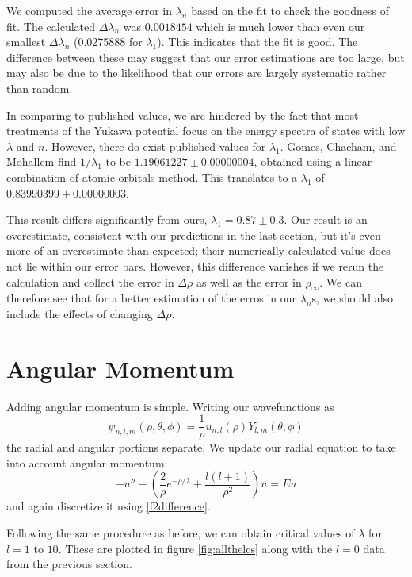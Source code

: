\documentclass[12pt,twoside]{reedthesis}
\newcommand{\eqn}[1]{\begin{equation}#1\end{equation}}
\begin{document}
We computed the average error in $\lambda_n$ based on the fit to check the goodness of fit. The calculated $\Delta \lambda_n$ was $0.0018454$ which is much lower than even our smallest $\Delta \lambda_n$ (0.0275888 for $\lambda_1$). This indicates that the fit is good. The difference between these may suggest that our error estimations are too large, but may also be due to the likelihood that our errors are largely systematic rather than random.

In comparing to published values, we are hindered by the fact that most treatments of the Yukawa potential focus on the energy spectra of states with low $\lambda$ and $n$. However, there do exist published values for $\lambda_1$\cite{PhysRevA.50.228}. Gomes, Chacham, and Mohallem find $1 / \lambda_1$ to be $1.19061227 \pm 0.00000004$, obtained using a linear combination of atomic orbitals method. This translates to a $\lambda_1$ of $0.83990399 \pm 0.00000003$. 

This result differs significantly from ours, $\lambda_1 = 0.87 \pm 0.3$. Our result is an overestimate, consistent with our predictions in the last section, but it's even more of an overestimate than expected; their numerically calculated value does not lie within our error bars. However, this difference vanishes if we rerun the calculation and collect the error in $\Delta \rho$ as well as the error in $\rho_{\infty}$. We can therefore see that for a better estimation of the erros in our $\lambda_n$s, we should also include the effects of changing $\Delta \rho$.

\section{Angular Momentum}

Adding angular momentum is simple. Writing our wavefunctions as
\eqn{
\psi_{n,l,m} (\rho,\theta,\phi) = \frac{1}{\rho}u_{n,l}(\rho) Y_{l,m}(\theta, \phi)
}
the radial and angular portions separate. We update our radial equation to take into account angular momentum:
\eqn{
-u'' - \left(\frac{2}{\rho}e^{-\rho/\lambda} + \frac{l(l+1)}{\rho^2}\right) u = E u
\label{eq:angmomentum}
}
and again discretize it using \eqref{f2difference}. 

Following the same procedure as before, we can obtain critical values of $\lambda$ for $l = 1$ to $10$. These are plotted in figure \ref{fig:allthelcs} along with the $l = 0$ data from the previous section.
\end{document}
